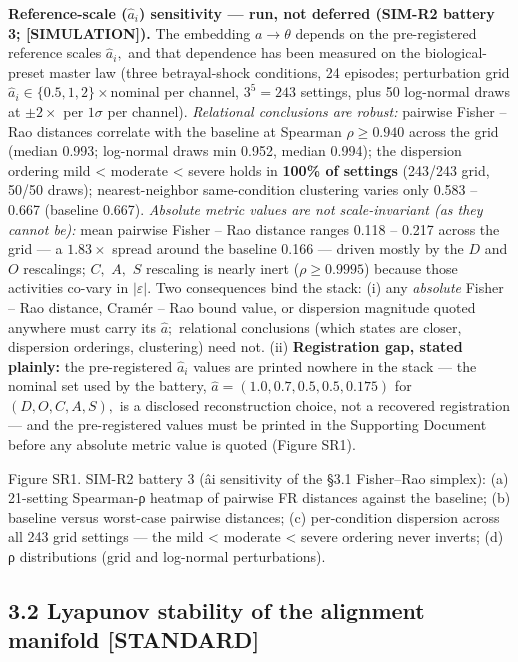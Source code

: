 \documentclass[
]{article}
\begin{document}
\textbf{Reference-scale (\(\hat{a}_i\)) sensitivity --- run, not
deferred (SIM-R2 battery 3; {[}SIMULATION{]}).} The embedding
\(a \to \theta\) depends on the pre-registered reference scales
\(\hat{a}_i,\) and that dependence has been measured on the
biological-preset master law (three betrayal-shock conditions, 24
episodes; perturbation grid \(\hat{a}_i \in \{0.5, 1, 2\}\times\)nominal
per channel, \(3^{5} = 243\) settings, plus 50 log-normal draws at
\(\pm 2\times\) per \(1\sigma\) per channel). \emph{Relational
conclusions are robust:} pairwise Fisher -- Rao distances correlate with
the baseline at Spearman \(\rho \geq 0.940\) across the grid (median
0.993; log-normal draws min 0.952, median 0.994); the dispersion
ordering mild \textless{} moderate \textless{} severe holds in
\textbf{100\% of settings} (243/243 grid, 50/50 draws); nearest-neighbor
same-condition clustering varies only 0.583 -- 0.667 (baseline 0.667).
\emph{Absolute metric values are not scale-invariant (as they cannot
be):} mean pairwise Fisher -- Rao distance ranges 0.118 -- 0.217 across
the grid --- a \(1.83\times\) spread around the baseline 0.166 ---
driven mostly by the \(D\) and \(O\) rescalings; \(C,\) \(A,\) \(S\)
rescaling is nearly inert (\(\rho \geq 0.9995\)) because those
activities co-vary in \(|\varepsilon|.\) Two consequences bind the
stack: (i) any \emph{absolute} Fisher -- Rao distance, Cramér -- Rao
bound value, or dispersion magnitude quoted anywhere must carry its
\(\hat{a};\) relational conclusions (which states are closer, dispersion
orderings, clustering) need not. (ii) \textbf{Registration gap, stated
plainly:} the pre-registered \(\hat{a}_i\) values are printed nowhere in
the stack --- the nominal set used by the battery,
\(\hat{a} = (1.0, 0.7, 0.5, 0.5, 0.175)\) for \((D, O, C, A, S),\) is a
disclosed reconstruction choice, not a recovered registration --- and
the pre-registered values must be printed in the Supporting Document
before any absolute metric value is quoted (Figure SR1).

Figure SR1. SIM-R2 battery 3 ({âi} sensitivity of the §3.1 Fisher--Rao
simplex): (a) 21-setting Spearman-{ρ} heatmap of pairwise FR distances
against the baseline; (b) baseline versus worst-case pairwise distances;
(c) per-condition dispersion across all 243 grid settings --- the mild
\textless{} moderate \textless{} severe ordering never inverts; (d) {ρ}
distributions (grid and log-normal perturbations).

\subsection{3.2 Lyapunov stability of the alignment manifold
{[}STANDARD{]}}\label{lyapunov-stability-of-the-alignment-manifold-standard}
\end{document}
